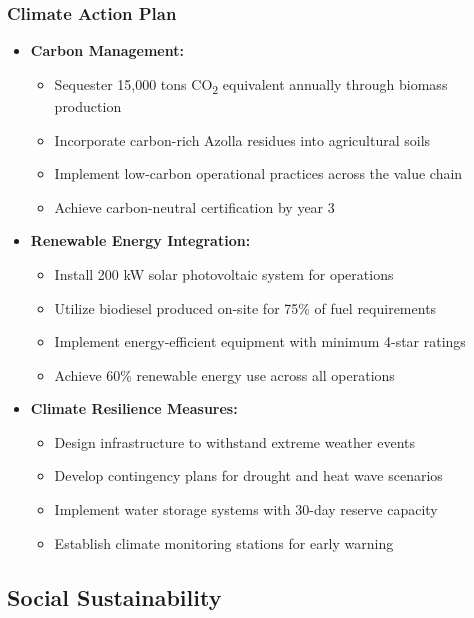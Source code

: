 \subsubsection{Climate Action Plan}
\begin{itemize}
    \item \textbf{Carbon Management:}
    \begin{itemize}
        \item Sequester 15,000 tons CO\textsubscript{2} equivalent annually through biomass production
        \item Incorporate carbon-rich Azolla residues into agricultural soils
        \item Implement low-carbon operational practices across the value chain
        \item Achieve carbon-neutral certification by year 3
    \end{itemize}
    
    \item \textbf{Renewable Energy Integration:}
    \begin{itemize}
        \item Install 200 kW solar photovoltaic system for operations
        \item Utilize biodiesel produced on-site for 75\% of fuel requirements
        \item Implement energy-efficient equipment with minimum 4-star ratings
        \item Achieve 60\% renewable energy use across all operations
    \end{itemize}
    
    \item \textbf{Climate Resilience Measures:}
    \begin{itemize}
        \item Design infrastructure to withstand extreme weather events
        \item Develop contingency plans for drought and heat wave scenarios
        \item Implement water storage systems with 30-day reserve capacity
        \item Establish climate monitoring stations for early warning
    \end{itemize}
\end{itemize}

\subsection{Social Sustainability}

